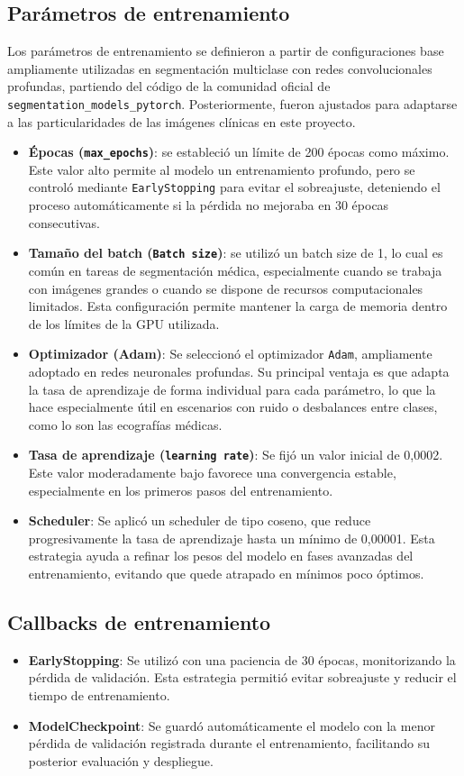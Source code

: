 \subsection{Parámetros de entrenamiento}
Los parámetros de entrenamiento se definieron a partir de configuraciones base ampliamente utilizadas en segmentación multiclase con redes convolucionales profundas, partiendo del código de la comunidad oficial de \texttt{segmentation\_models\_pytorch}. Posteriormente, fueron ajustados para adaptarse a las particularidades de las imágenes clínicas en este proyecto.
\begin{itemize}
    \item \textbf{Épocas (\texttt{max\_epochs})}: se estableció un límite de 200 épocas como máximo. Este valor alto permite al modelo un entrenamiento profundo, pero se controló mediante \texttt{EarlyStopping} para evitar el sobreajuste, deteniendo el proceso automáticamente si la pérdida no mejoraba en 30 épocas consecutivas. 
    \item \textbf{Tamaño del batch (\texttt{Batch size})}: se utilizó un batch size de 1, lo cual es común en tareas de segmentación médica, especialmente cuando se trabaja con imágenes grandes o cuando se dispone de recursos computacionales limitados. Esta configuración permite mantener la carga de memoria dentro de los límites de la GPU utilizada.
    \item \textbf{Optimizador (Adam)}: Se seleccionó el optimizador \texttt{Adam}, ampliamente adoptado en redes neuronales profundas. Su principal ventaja es que adapta la tasa de aprendizaje de forma individual para cada parámetro, lo que la hace especialmente útil en escenarios con ruido o desbalances entre clases, como lo son las ecografías médicas.
    \item \textbf{Tasa de aprendizaje (\texttt{learning rate})}: Se fijó un valor inicial de 0,0002. Este valor moderadamente bajo favorece una convergencia estable, especialmente en los primeros pasos del entrenamiento. 
    \item \textbf{Scheduler}: Se aplicó un scheduler de tipo coseno, que reduce progresivamente la tasa de aprendizaje hasta un mínimo de 0,00001. Esta estrategia ayuda a refinar los pesos del modelo en fases avanzadas del entrenamiento, evitando que quede atrapado en mínimos poco óptimos.
\end{itemize}
\subsection{Callbacks de entrenamiento}
\begin{itemize}
    \item \textbf{EarlyStopping}: Se utilizó con una paciencia de 30 épocas, monitorizando la pérdida de validación. Esta estrategia permitió evitar sobreajuste y reducir el tiempo de entrenamiento.
     \item \textbf{ModelCheckpoint}: Se guardó automáticamente el modelo con la menor pérdida de validación registrada durante el entrenamiento, facilitando su posterior evaluación y despliegue.
\end{itemize}
